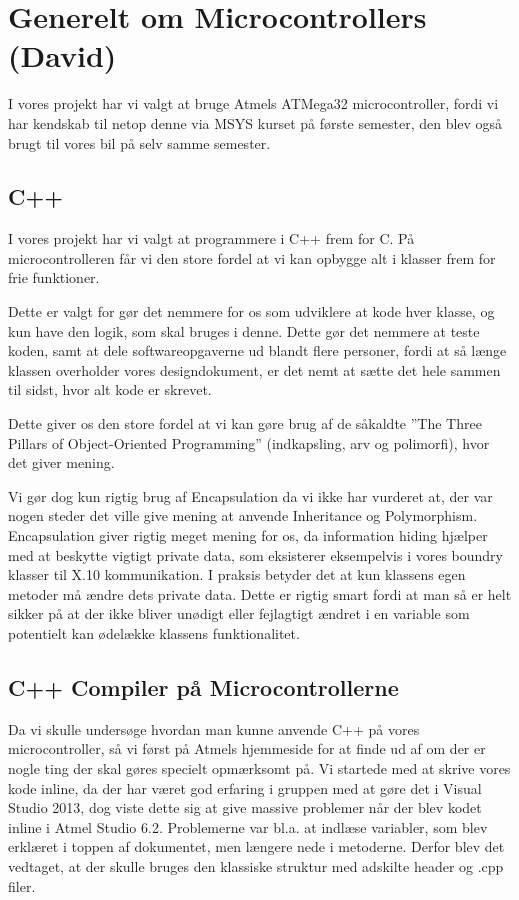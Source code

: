 \section{Generelt om Microcontrollers (David)}
I vores projekt har vi valgt at bruge Atmels ATMega32 microcontroller, fordi vi har kendskab til netop denne via MSYS kurset på første semester, den blev også brugt til vores bil på selv samme semester.

\subsection{C++}
I vores projekt har vi valgt at programmere i C++ frem for C. På microcontrolleren får vi den store fordel at vi kan opbygge alt i klasser frem for frie funktioner.

Dette er valgt for gør det nemmere for os som udviklere at kode hver klasse, og kun have den logik, som skal bruges i denne. Dette gør det nemmere at teste koden, samt at dele softwareopgaverne ud blandt flere personer, fordi at så længe klassen overholder vores designdokument, er det nemt at sætte det hele sammen til sidst, hvor alt kode er skrevet.

Dette giver os den store fordel at vi kan gøre brug af de såkaldte ''The Three Pillars of Object-Oriented Programming'' (indkapsling, arv og polimorfi), hvor det giver mening.

Vi gør dog kun rigtig brug af Encapsulation da vi ikke har vurderet at, der var nogen steder det ville give mening at anvende Inheritance og Polymorphism. 
Encapsulation giver rigtig meget mening for os, da information hiding hjælper med at beskytte vigtigt private data, som eksisterer eksempelvis i vores boundry klasser til X.10 kommunikation. 
I praksis betyder det at kun klassens egen metoder må ændre dets private data. Dette er rigtig smart fordi at man så er helt sikker på at der ikke bliver unødigt eller fejlagtigt ændret i en variable som potentielt kan ødelække klassens funktionalitet.

\subsection{C++ Compiler på Microcontrollerne}\label{sec:micro}
Da vi skulle undersøge hvordan man kunne anvende C++ på vores microcontroller, så vi først på Atmels hjemmeside\cite{lib:atmel} for at finde ud af om der er nogle ting der skal gøres specielt opmærksomt på. Vi startede med at skrive vores kode inline, da der har været god erfaring i gruppen med at gøre det i Visual Studio 2013, dog viste dette sig at give massive problemer når der blev kodet inline i Atmel Studio 6.2. Problemerne var bl.a. at indlæse variabler, som blev erklæret i toppen af dokumentet, men længere nede i metoderne. Derfor blev det vedtaget, at der skulle bruges den klassiske struktur med adskilte header og .cpp filer.

